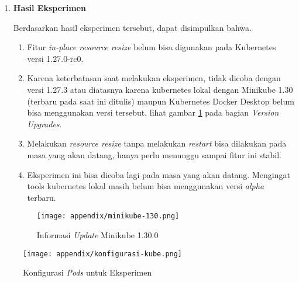 \begin{enumerate}
    \item \textbf{Hasil Eksperimen}
    
        Berdasarkan hasil eksperimen tersebut, dapat disimpulkan bahwa.

        \begin{enumerate}
            \item Fitur \textit{in-place resource resize} belum bisa digunakan pada Kubernetes versi 1.27.0-rc0.
            \item Karena keterbatasan saat melakukan eksperimen, tidak dicoba dengan versi 1.27.3 atau diatasnya karena kubernetes lokal dengan Minikube 1.30 (terbaru pada saat ini ditulis) maupun Kubernetes Docker Desktop belum bisa menggunakan versi tersebut, lihat gambar \ref{fig:appendix1-minikube} pada bagian \textit{Version Upgrades}.
            \item Melakukan \textit{resource resize} tanpa melakukan \textit{restart} bisa dilakukan pada masa yang akan datang, hanya perlu menunggu sampai fitur ini stabil.
            \item Eksperimen ini bisa dicoba lagi pada masa yang akan datang. Mengingat tools kubernetes lokal masih belum bisa menggunakan versi \textit{alpha} terbaru.
        \end{enumerate}

        \begin{figure}[h]
            \centering
            \texttt{[image: appendix/minikube-130.png]}
            \caption{Informasi \textit{Update} Minikube 1.30.0}
            \label{fig:appendix1-minikube}
        \end{figure}
\end{enumerate}

\begin{figure}[h]
    \centering
    \texttt{[image: appendix/konfigurasi-kube.png]}
    \caption{Konfigurasi \textit{Pods} untuk Eksperimen}
    \label{fig:appendix1-kube-config}
\end{figure}